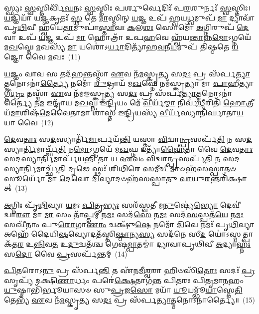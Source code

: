 𑌸𑍍𑌫𑍍𑌯𑌃 \ul{𑌸𑍍𑌵}\-𑌸𑍍𑌤𑌿𑌰𑍍𑌵𑌿᳴\-\ul{𑌘}\-𑌨𑌃 \ul{𑌸𑍍𑌵}\-𑌸𑍍𑌤𑌿𑌃 𑌪𑌰𑍍\mbox{}\-\ul{𑌶𑍁}\-𑌰𑍍𑌵𑍇𑌦𑌿𑌃᳴ 𑌪\-\ul{𑌰}\-𑌶𑍁𑌰𑍍𑌨𑌃᳴ \ul{𑌸𑍍𑌵}\-𑌸𑍍𑌤𑌿𑌃। \ul{𑌯}\-𑌜𑍍𑌞𑌿𑌯𑌾᳴ 𑌯\-\ul{𑌜𑍍𑌞}\-𑌕𑍃𑌤𑌃᳴ \ul{𑌸𑍍𑌥} 𑌤𑍇 \ul{𑌮𑌾}\-𑌸𑍍𑌮𑌿𑌨𑍍 \ul{𑌯}\-𑌜𑍍𑌞 𑌉𑌪᳴ 𑌹𑍍𑌵𑌯\-\ul{𑌧𑍍𑌵}\-𑌮𑍁𑌪᳴ \ul{𑌮𑌾} 𑌦𑍍𑌯𑌾𑌵𑌾᳴𑌪𑍃\-\ul{𑌥𑌿}\-𑌵𑍀 𑌹𑍍𑌵᳴𑌯𑍇\-\ul{𑌤𑌾}\-𑌮𑍁𑌪𑌾॑\-\ul{𑌸𑍍𑌤𑌾}\-𑌵𑌃 \ul{𑌕}\-𑌲\-\ul{𑌶𑌃} 𑌸𑍋𑌮𑍋᳴ \ul{𑌅}\-𑌗𑍍𑌨𑌿𑌰𑍁𑌪᳴ \ul{𑌦𑍇}\-𑌵𑌾 𑌉𑌪᳴ \ul{𑌯}\-𑌜𑍍𑌞 𑌉𑌪᳴ \ul{𑌮𑌾} 𑌹𑍋𑌤𑍍𑌰𑌾᳴ 𑌉𑌪\-\ul{𑌹}\-𑌵𑍇 𑌹𑍍𑌵᳴𑌯\-\ul{𑌨𑍍𑌤𑌾}\-𑌨𑍍𑌨\-\ul{𑌮𑍋}\-\-𑌽𑌗𑍍𑌨𑌯𑍇᳴ 𑌮\-\ul{𑌖}\-𑌘𑍍𑌨𑍇 \ul{𑌮}\-𑌖𑌸𑍍𑌯᳴ \ul{𑌮𑌾} 𑌯𑌶𑍋॑\-𑌽\-\ul{𑌰𑍍𑌯𑌾}\-𑌦𑌿𑌤𑍍𑌯𑌾᳴𑌹\-\ul{𑌵}\-𑌨𑍀\-\ul{𑌯}\-𑌮𑍁𑌪᳴ 𑌤𑌿𑌷𑍍𑌠𑌤𑍇 \ul{𑌯}\-𑌜𑍍𑌞𑍋 𑌵𑍈 \ul{𑌮}\-𑌖𑌃~(11)

\-\ul{𑌯}\-𑌜𑍍𑌞𑌂 𑌵𑌾𑌵 𑌸 𑌤𑌦᳴\-\ul{𑌹}\-𑌨𑍍𑌤𑌸𑍍𑌮𑌾᳴ \ul{𑌏}\-𑌵 𑌨᳴\-\ul{𑌮}\-𑌸𑍍𑌕𑍃\-\ul{𑌤𑍍𑌯} 𑌸\-\ul{𑌦𑌃} 𑌪𑍍𑌰 𑌸᳴𑌰𑍍𑌪\-\ul{𑌤𑍍𑌯𑌾}\-𑌤𑍍𑌮𑌨𑍋\-𑌽𑌨𑌾॑\-\ul{𑌰𑍍𑌤𑍍𑌯𑍈} 𑌨𑌮𑍋᳴ \ul{𑌰𑍁}\-𑌦𑍍𑌰𑌾𑌯᳴ 𑌮\-\ul{𑌖}\-𑌘𑍍𑌨𑍇 𑌨𑌮᳴𑌸𑍍𑌕𑍃𑌤𑍍𑌯𑌾 𑌮𑌾 \ul{𑌪𑌾}\-𑌹𑍀𑌤𑍍𑌯𑌾𑌗𑍍𑌨𑍀॑\-\ul{𑌧𑍍𑌰𑌂} 𑌤𑌸𑍍𑌮𑌾᳴ \ul{𑌏}\-𑌵 𑌨᳴𑌮𑌙𑌸𑍍𑌕𑍃\-\ul{𑌤𑍍𑌯} 𑌸\-\ul{𑌦𑌃} 𑌪𑍍𑌰 𑌸᳴𑌰𑍍𑌪\-\ul{𑌤𑍍𑌯𑌾}\-𑌤𑍍𑌮𑌨𑍋\-𑌽𑌨𑌾॑𑌰𑍍𑌤𑍍𑌯𑍈 𑌨\-\ul{𑌮} 𑌇𑌨𑍍𑌦𑍍𑌰𑌾᳴𑌯 𑌮\-\ul{𑌖}\-𑌘𑍍𑌨 𑌇᳴\-\ul{𑌨𑍍𑌦𑍍𑌰𑌿}\-𑌯𑌂 𑌮𑍇᳴ \ul{𑌵𑍀}\-𑌰𑍍𑌯᳴\-\ul{𑌮𑍍𑌮𑌾} 𑌨𑌿𑌰𑍍𑌵᳴\-\ul{𑌧𑍀}\-𑌰𑌿𑌤𑌿᳴ \ul{𑌹𑍋}\-𑌤𑍍𑌰𑍀𑌯᳴\-\ul{𑌮𑌾}\-𑌶𑌿𑌷᳴\-\ul{𑌮𑍇}\-𑌵𑍈𑌤𑌾𑌮𑌾 𑌶𑌾॑𑌸𑍍𑌤 𑌇\-\ul{𑌨𑍍𑌦𑍍𑌰𑌿}\-𑌯𑌸𑍍𑌯᳴ \ul{𑌵𑍀}\-𑌰𑍍𑌯᳴𑌸𑍍𑌯𑌾𑌨𑌿᳴𑌰𑍍𑌘𑌾𑌤𑌾\-\ul{𑌯} 𑌯𑌾 𑌵𑍈~(12)

\-\ul{𑌦𑍇}\-𑌵\-\ul{𑌤𑌾𑌃} 𑌸\-\ul{𑌦}\-𑌸𑍍𑌯𑌾𑌰𑍍𑌤𑌿᳴\-\ul{𑌮𑌾}\-𑌰𑍍𑌪𑌯᳴\-\ul{𑌨𑍍𑌤𑌿} 𑌯𑌸𑍍𑌤𑌾 \ul{𑌵𑌿}\-𑌦𑍍𑌵𑌾\-\ul{𑌨𑍍𑌪𑍍𑌰}\-𑌸𑌰𑍍𑌪᳴\-\ul{𑌤𑌿} 𑌨 𑌸\-\ul{𑌦}\-𑌸𑍍𑌯𑌾\-\ul{𑌰𑍍𑌤𑌿}\-𑌮𑌾𑌰𑍍𑌚𑍍𑌛᳴\-\ul{𑌤𑌿} 𑌨\-\ul{𑌮𑍋}\-\-𑌽𑌗𑍍𑌨𑌯𑍇᳴ 𑌮\-\ul{𑌖}\-𑌘𑍍𑌨 𑌇𑌤𑍍𑌯𑌾᳴\-\ul{𑌹𑍈}\-𑌤𑌾 𑌵𑍈 \ul{𑌦𑍇}\-𑌵\-\ul{𑌤𑌾𑌃} 𑌸\-\ul{𑌦}\-𑌸𑍍𑌯𑌾\-\ul{𑌰𑍍𑌤𑌿}\-𑌮𑌾𑌰𑍍𑌪᳴𑌯\-\ul{𑌨𑍍𑌤𑌿} 𑌤𑌾 𑌯 \ul{𑌏}\-𑌵𑌂 \ul{𑌵𑌿}\-𑌦𑍍𑌵𑌾\-\ul{𑌨𑍍𑌪𑍍𑌰}\-𑌸𑌰𑍍𑌪᳴\-\ul{𑌤𑌿} 𑌨 𑌸\-\ul{𑌦}\-𑌸𑍍𑌯𑌾\-\ul{𑌰𑍍𑌤𑌿}\-𑌮𑌾𑌰𑍍𑌚𑍍𑌛᳴𑌤𑌿 \ul{𑌦𑍃}\-𑌢𑍇 𑌸𑍍𑌥𑌃᳴ 𑌶𑌿\-\ul{𑌥𑌿}\-𑌰𑍇 \ul{𑌸}\-𑌮𑍀\-\ul{𑌚𑍀} 𑌮𑌾𑍞𑌹᳴𑌸𑌸𑍍𑌪𑌾\-\ul{𑌤}\-\-\ul{𑍞} 𑌸𑍂𑌰𑍍𑌯𑍋᳴ 𑌮𑌾 \ul{𑌦𑍇}\-𑌵𑍋 \ul{𑌦𑌿}\-𑌵𑍍𑌯𑌾𑌦𑍞𑌹᳴𑌸𑌸𑍍𑌪𑌾𑌤𑍁 \ul{𑌵𑌾}\-𑌯𑍁\-\ul{𑌰}\-𑌨𑍍𑌤𑌰𑌿᳴𑌕𑍍𑌷𑌾𑌤𑍍~(13)

\-\ul{𑌅}\-𑌗𑍍𑌨𑌿𑌃 𑌪𑍃᳴\-\ul{𑌥𑌿}\-𑌵𑍍𑌯𑌾 \ul{𑌯}\-𑌮𑌃 \ul{𑌪𑌿}\-𑌤𑍃\-\ul{𑌭𑍍𑌯𑌃} 𑌸𑌰᳴𑌸𑍍𑌵𑌤𑍀 𑌮\-\ul{𑌨𑍁}\-𑌷𑍍𑌯𑍇॑\-\ul{𑌭𑍍𑌯𑍋} 𑌦𑍇𑌵𑍀॑ 𑌦𑍍𑌵𑌾\-\ul{𑌰𑍗} 𑌮𑌾 \ul{𑌮𑌾} 𑌸𑌂 𑌤𑌾᳴\-\ul{𑌪𑍍𑌤}\-𑌮𑍍 𑌨\-\ul{𑌮𑌃} 𑌸𑌦᳴\-\ul{𑌸𑍇} 𑌨\-\ul{𑌮𑌃} 𑌸𑌦᳴\-\ul{𑌸}\-𑌸𑍍𑌪𑌤᳴\-\ul{𑌯𑍇} 𑌨\-\ul{𑌮𑌃} 𑌸𑌖𑍀᳴𑌨𑌾𑌂 𑌪𑍁\-\ul{𑌰𑍋}\-𑌗𑌾\-\ul{𑌣𑌾𑌂} 𑌚𑌕𑍍𑌷𑍁᳴\-\ul{𑌷𑍇} 𑌨𑌮𑍋᳴ \ul{𑌦𑌿}\-𑌵𑍇 𑌨𑌮𑌃᳴ 𑌪𑍃\-\ul{𑌥𑌿}\-𑌵𑍍𑌯𑌾 𑌅𑌹𑍇᳴ 𑌦𑍈𑌧𑌿\-\ul{𑌷}\-𑌵𑍍𑌯𑍋𑌦𑌤᳴𑌸𑍍𑌤𑌿\-\ul{𑌷𑍍𑌠𑌾}\-𑌨𑍍𑌯\-\ul{𑌸𑍍𑌯} 𑌸𑌦᳴𑌨𑍇 𑌸𑍀\-\ul{𑌦} 𑌯𑍋॑\-𑌽𑌸𑍍𑌮𑌤𑍍𑌪𑌾𑌕᳴𑌤\-\ul{𑌰} 𑌉\-\ul{𑌨𑍍𑌨𑌿}\-𑌵\-\ul{𑌤} 𑌉\-\ul{𑌦𑍁}\-𑌦𑍍𑌵𑌤᳴𑌶𑍍𑌚 𑌗𑍇𑌷\-\ul{𑌮𑍍𑌪𑌾}\-𑌤𑌮𑍍𑌮𑌾॑ 𑌦𑍍𑌯𑌾𑌵𑌾𑌪𑍃𑌥𑌿𑌵𑍀 \ul{𑌅}\-𑌦𑍍𑌯𑌾\-\ul{𑌹𑍍𑌨𑌃} 𑌸\-\ul{𑌦𑍋} 𑌵𑍈 \ul{𑌪𑍍𑌰}\-𑌸𑌰𑍍𑌪᳴𑌨𑍍𑌤𑌮𑍍~(14)

\-\ul{𑌪𑌿}\-𑌤𑌰𑍋\-𑌽\-\ul{𑌨𑍁} 𑌪𑍍𑌰 𑌸᳴𑌰𑍍𑌪\-\ul{𑌨𑍍𑌤𑌿} 𑌤 𑌏᳴𑌨𑌮𑍀\-\ul{𑌶𑍍𑌵}\-𑌰𑌾 𑌹𑌿𑍞𑌸𑌿᳴\-\ul{𑌤𑍋𑌃} 𑌸𑌦𑌃᳴ \ul{𑌪𑍍𑌰}\-𑌸𑍃𑌪𑍍𑌯᳴ 𑌦𑌕𑍍𑌷𑌿\-\ul{𑌣𑌾}\-𑌰𑍍𑌧𑌂 𑌪𑌰𑍇॑\-\ul{𑌕𑍍𑌷𑍇}\-𑌤𑌾𑌗᳴𑌨𑍍𑌤 𑌪𑌿𑌤𑌰𑌃 𑌪𑌿\-\ul{𑌤𑍃}\-𑌮𑌾\-\ul{𑌨}\-𑌹𑌂 \ul{𑌯𑍁}\-𑌷𑍍𑌮𑌾𑌭𑌿᳴𑌰𑍍𑌭𑍂𑌯𑌾𑌸𑍞 𑌸𑍁\-\ul{𑌪𑍍𑌰}\-𑌜\-\ul{𑌸𑍋} 𑌮𑌯𑌾᳴ \ul{𑌯𑍂}\-𑌯𑌮𑍍𑌭𑍂᳴\-\ul{𑌯𑌾}\-𑌸𑍍𑌤𑍇\-\ul{𑌤𑌿} 𑌤𑍇𑌭𑍍𑌯᳴ \ul{𑌏}\-𑌵 𑌨᳴\-\ul{𑌮}\-𑌸𑍍𑌕𑍃\-\ul{𑌤𑍍𑌯} 𑌸\-\ul{𑌦𑌃} 𑌪𑍍𑌰 𑌸᳴𑌰𑍍𑌪\-\ul{𑌤𑍍𑌯𑌾}\-𑌤𑍍𑌮𑌨𑍋\-𑌽𑌨𑌾॑𑌰𑍍𑌤𑍍𑌯𑍈॥~(15)

